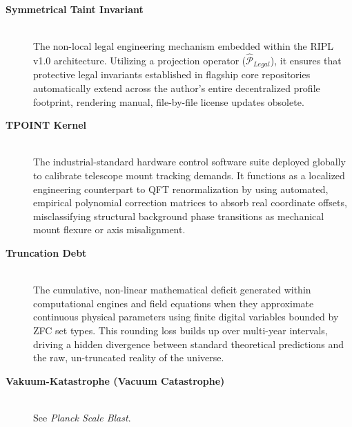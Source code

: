 \documentclass[11pt,a4paper]{article}
\theoremstyle{plain}
\theoremstyle{definition}
\begin{document}
\begin{description}
    \item[\textbf{Symmetrical Taint Invariant}] \hfill \\
    The non-local legal engineering mechanism embedded within the RIPL v1.0 architecture. Utilizing a projection operator ($\hat{\mathcal{P}}_{Legal}$), it ensures that protective legal invariants established in flagship core repositories automatically extend across the author's entire decentralized profile footprint, rendering manual, file-by-file license updates obsolete.

    \item[\textbf{TPOINT Kernel}] \hfill \\
    The industrial-standard hardware control software suite deployed globally to calibrate telescope mount tracking demands. It functions as a localized engineering counterpart to QFT renormalization by using automated, empirical polynomial correction matrices to absorb real coordinate offsets, misclassifying structural background phase transitions as mechanical mount flexure or axis misalignment.

    \item[\textbf{Truncation Debt}] \hfill \\
    The cumulative, non-linear mathematical deficit generated within computational engines and field equations when they approximate continuous physical parameters using finite digital variables bounded by ZFC set types. This rounding loss builds up over multi-year intervals, driving a hidden divergence between standard theoretical predictions and the raw, un-truncated reality of the universe.

    \item[\textbf{Vakuum-Katastrophe (Vacuum Catastrophe)}] \hfill \\
    See \textit{Planck Scale Blast}.

\end{description}

\end{document}
